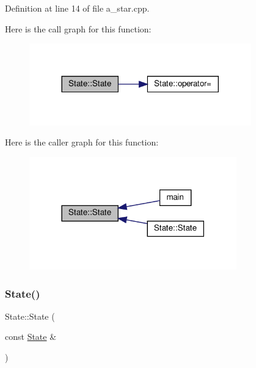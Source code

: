 Definition at line 14 of file a\+\_\+star.\+cpp.

Here is the call graph for this function\+:
\nopagebreak
\begin{figure}[H]
\begin{center}
\leavevmode
\includegraphics[width=272pt]{struct_state_a200e450f63a590ee3a777b60684963ee_cgraph}
\end{center}
\end{figure}
Here is the caller graph for this function\+:
\nopagebreak
\begin{figure}[H]
\begin{center}
\leavevmode
\includegraphics[width=254pt]{struct_state_a200e450f63a590ee3a777b60684963ee_icgraph}
\end{center}
\end{figure}
\mbox{\label{struct_state_ad463f272453461a57c8b9e11f6cad8b6}} 
\subsubsection{\texorpdfstring{State()}{State()}\hspace{0.1cm}{\footnotesize\ttfamily [2/8]}}
{\footnotesize\ttfamily State\+::\+State (\begin{DoxyParamCaption}\item[{const \hyperlink{struct_state}{State} \&}]{ }\end{DoxyParamCaption})\hspace{0.3cm}{\ttfamily [default]}}

\mbox{\label{struct_state_a28668e1b15e6d6cfb63106769db218bc}} 
